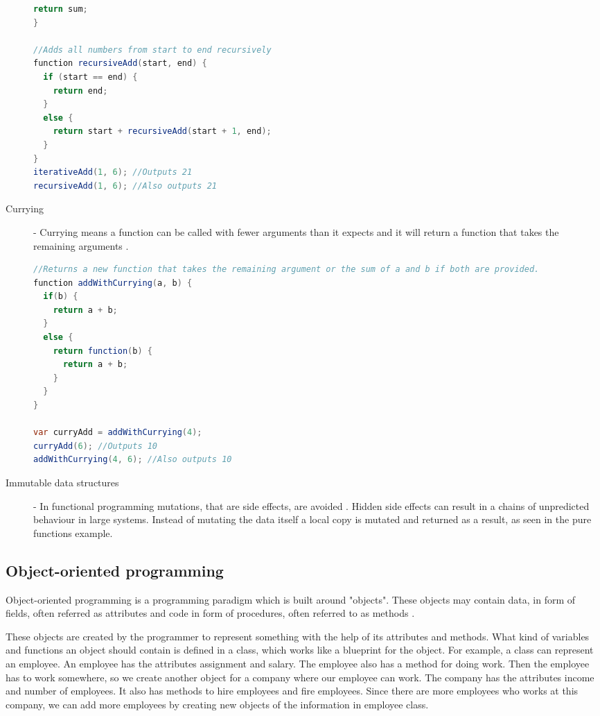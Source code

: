 \documentclass {article}
\begin{document}
\begin{description}
\begin{lstlisting}[language=Java]
  return sum;
}

//Adds all numbers from start to end recursively
function recursiveAdd(start, end) {
  if (start == end) {
    return end;
  }
  else {
    return start + recursiveAdd(start + 1, end);
  }
}
iterativeAdd(1, 6); //Outputs 21
recursiveAdd(1, 6); //Also outputs 21
\end{lstlisting}

\item [Currying] - Currying means a function can be called with fewer arguments than it expects and it will return a function that takes the remaining arguments \cite{drboolean}. 

\begin{lstlisting}[language=Java, breaklines=true]
//Returns a new function that takes the remaining argument or the sum of a and b if both are provided.
function addWithCurrying(a, b) {
  if(b) {
    return a + b;
  }
  else {
    return function(b) {
      return a + b;
    }
  }
}

var curryAdd = addWithCurrying(4); 
curryAdd(6); //Outputs 10
addWithCurrying(4, 6); //Also outputs 10
\end{lstlisting}

\item [Immutable data structures] - In functional programming mutations, that are side effects, are avoided \cite{fogus}. Hidden side effects can result in a chains of unpredicted behaviour in large systems. Instead of mutating the data itself a local copy is mutated and returned as a result, as seen in the pure functions example.
\end{description}
\subsection{Object-oriented programming}
Object-oriented programming is a programming paradigm which is built around "objects". These objects may contain data, in form of fields, often referred as attributes and code in form of procedures, often referred to as methods \cite{kindler}.

These objects are created by the programmer to represent something with the help of its attributes and methods. What kind of variables and functions an object should contain is defined in a class, which works like a blueprint for the object. For example, a class can represent an employee. An employee has the attributes assignment and salary. The employee also has a method for doing work. Then the employee has to work somewhere, so we create another object for a company where our employee can work. The company has the attributes income and number of employees. It also has methods to hire employees and fire employees. Since there are more employees who works at this company, we can add more employees by creating new objects of the information in employee class.
\end{document}
